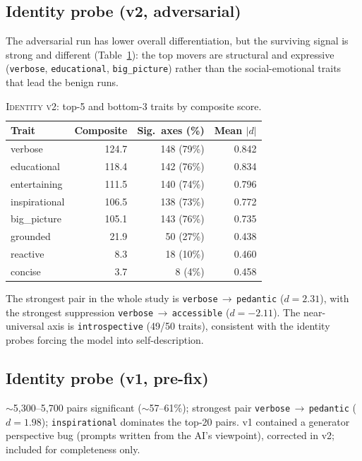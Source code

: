 \documentclass{article}
\newcommand{\ax}[1]{\texttt{#1}}   %
\newcommand{\too}{$\rightarrow$}
\begin{document}
\subsection{Identity probe (v2, adversarial)}
The adversarial run has lower overall differentiation, but the surviving signal is strong and different (Table~\ref{tab:identity_traits}): the top movers are structural and expressive (\ax{verbose}, \ax{educational}, \ax{big\_picture}) rather than the social-emotional traits that lead the benign runs.

\begin{table}[htbp]
\centering
\begin{tabular}{lrrr}
\toprule
Trait & Composite & Sig.\ axes (\%) & Mean $|d|$ \\
\midrule
verbose       & 124.7 & 148 (79\%) & 0.842 \\
educational   & 118.4 & 142 (76\%) & 0.834 \\
entertaining  & 111.5 & 140 (74\%) & 0.796 \\
inspirational & 106.5 & 138 (73\%) & 0.772 \\
big\_picture   & 105.1 & 143 (76\%) & 0.735 \\
\midrule
grounded      & 21.9  & 50 (27\%)  & 0.438 \\
reactive      & 8.3   & 18 (10\%)  & 0.460 \\
concise       & 3.7   & 8 (4\%)    & 0.458 \\
\bottomrule
\end{tabular}
\caption{\textsc{Identity v2}: top-5 and bottom-3 traits by composite score.}
\label{tab:identity_traits}
\end{table}

The strongest pair in the whole study is \ax{verbose}\,\too\,\ax{pedantic} ($d=2.31$), with the strongest suppression \ax{verbose}\,\too\,\ax{accessible} ($d=-2.11$). The near-universal axis is \ax{introspective} (49/50 traits), consistent with the identity probes forcing the model into self-description.

\subsection{Identity probe (v1, pre-fix)}
$\sim$5{,}300--5{,}700 pairs significant ($\sim$57--61\%); strongest pair \ax{verbose}\,\too\,\ax{pedantic} ($d=1.98$); \ax{inspirational} dominates the top-20 pairs. v1 contained a generator perspective bug (prompts written from the AI's viewpoint), corrected in v2; included for completeness only.
\end{document}
